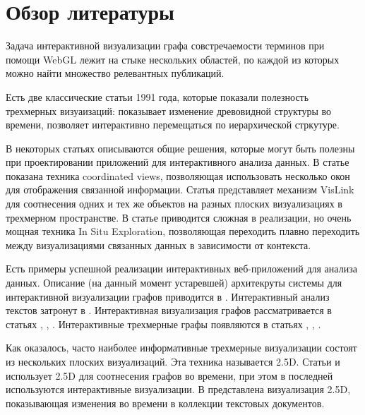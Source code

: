 \section*{Обзор литературы}
\label{sec:lit_review}

Задача интерактивной визуализации графа совстречаемости терминов при помощи WebGL лежит на стыке нескольких областей, по каждой из которых можно найти множество релевантных публикаций.

Есть две классические статьи 1991 года, которые показали полезность трехмерных визуаизаций: \cite{classic_ecologies} показывает изменение древовидной структуры во времени, \cite{classic_3d_trees} позволяет интерактивно перемещаться по иерархической стркутуре.

В некоторых статьях описываются общие решения, которые могут быть полезны при проектировании приложений для интерактивного анализа данных. В статье \cite{interactive_coordinated_views} показана техника coordinated views, позволяющая использовать несколько окон для отображения связанной информации. Статья \cite{25d_vislink} представляет механизм VisLink для соотнесения одних и тех же объектов на разных плоских визуализациях в трехмерном пространстве. В статье \cite{in_situ} приводится сложная в реализации, но очень мощная техника In Situ Exploration, позволяющая переходить плавно переходить между визуализациями связанных данных в зависимости от контекста.

Есть примеры успешной реализации интерактивных веб-приложений для анализа данных. Описание (на данный момент устаревшей) архитекруты системы для интерактивной визуализации графов приводится в \cite{scalable_web}. Интерактивный анализ текстов затронут в \cite{interactive_document_exploration}. Интерактивная визуализация графов рассматривается в статьях \cite{interactive_relations}, \cite{interactive_large_graph}, \cite{interactive_tpp}. Интерактивные трехмерные графы появляются в статьях \cite{interactive_3d_graph}, \cite{interactive_graph_3d_fast}, \cite{graph_interactive}.

Как оказалось, часто наиболее информативные трехмерные визуализации состоят из нескольких плоских визуализаций. Эта техника называется 2.5D. Статьи \cite{25d_simultaneous} и \cite{25d_interactive_graph} использует 2.5D для соотнесения графов во времени, при этом в последней используются интерактивные визуализации. В \cite{25d_bloggers} представлена визуализация 2.5D, показывающая изменения во времени в коллекции текстовых документов. 

